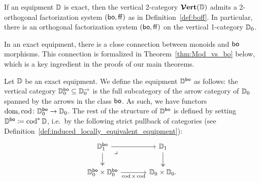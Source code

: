 \documentclass[11pt,oneside,article]{memoir}
\begin{document}
\begin{theorem}\cite[Theorem~4.17]{Schultz2015}
    \label{thm:orthogonal}
  If an equipment $\mathbb{D}$ is exact, then the vertical 2-category $\bm{\mathcal{V}}\mathbf{ert}(\mathbb{D})$ admits a
  2-orthogonal factorization system $(\mathsf{bo},\mathsf{ff})$ as in Definition~\ref{def:boff}. In particular,
  there is an orthogonal factorization system $(\mathsf{bo},\mathsf{ff})$ on the vertical 1-category $\mathbb{D}_0$.
\end{theorem}

In an exact equipment, there is a close connection between monoids and $\mathsf{bo}$ morphisms. This
connection is formalized in Theorem~\ref{thm:Mod_vs_bo} below, which is a key ingredient in the
proofs of our main theorems.

\begin{definition}
  Let $\mathbb{D}$ be an exact equipment. We define the equipment $\mathbb{D}^{\mathsf{bo}}$ as follows: the
  vertical category $\mathbb{D}_0^{\mathsf{bo}}\subseteq\mathbb{D}_0^{\rightarrow}$ is the full subcategory of the
  arrow category of $\mathbb{D}_0$ spanned by the arrows in the class $\mathsf{bo}$. As such, we have functors
  $\operatorname{dom},\operatorname{cod}\colon\mathbb{D}_0^{\mathsf{bo}}\to\mathbb{D}_0$. The rest of the structure of $\mathbb{D}^{\mathsf{bo}}$ is
  defined by setting $\mathbb{D}^{\mathsf{bo}}\coloneqq\operatorname{cod}^*\mathbb{D}$, i.e.\ by the following strict pullback of categories (see Definition~\ref{def:induced_locally_equivalent_equipment}):
  \[ \begin{tikzcd}[column sep=large]
    \dcat{D}_1^{\bo} \ar[r] \ar[d, two heads] \ar[dr,phantom,"\lrcorner" very near start]
      & \dcat{D}_1 \ar[d, two heads] \\
    \dcat{D}_0^{\bo}\times\dcat{D}_0^{\bo} \ar[r,"\cod\times\cod"']
      & \dcat{D}_0\times\dcat{D}_0.
  \end{tikzcd} \]
\end{definition}
\end{document}
